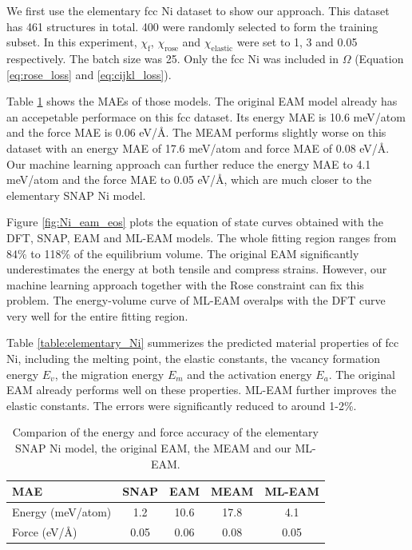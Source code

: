 \documentclass[prb,reprint]{revtex4-2}
\begin{document}
We first use the elementary fcc Ni dataset to show our approach. This dataset 
has 461 structures in total. 400 were randomly selected to form the training 
subset. In this experiment, $\chi_{\mathrm{f}}$, $\chi_{\mathrm{rose}}$ and 
$\chi_{\mathrm{elastic}}$ were set to 1, 3 and 0.05 respectively. The batch size
was 25. Only the fcc Ni was included in $\Omega$ (Equation \ref{eq:rose_loss} 
and \ref{eq:cijkl_loss}).

Table \ref{table:elementary_Ni_mae} shows the MAEs of those models. The original 
EAM model already has an accepetable performace on this fcc dataset. Its energy 
MAE is 10.6 meV/atom and the force MAE is 0.06 eV/\AA. The MEAM performs 
slightly worse on this dataset with an energy MAE of 17.6 meV/atom and force MAE
of 0.08 eV/\AA. Our machine learning approach can further reduce the energy MAE 
to 4.1 meV/atom and the force MAE to 0.05 eV/\AA, which are much closer to the 
elementary SNAP Ni model.

Figure \ref{fig:Ni_eam_eos} plots the equation of state curves obtained with the 
DFT, SNAP, EAM and ML-EAM models. The whole fitting region ranges from 84\% to 
118\% of the equilibrium volume. The original EAM significantly underestimates 
the energy at both tensile and compress strains. However, our machine learning 
approach together with the Rose constraint can fix this problem. The 
energy-volume curve of ML-EAM overalps with the DFT curve very well for the 
entire fitting region. 

Table \ref{table:elementary_Ni} summerizes the predicted material properties of 
fcc Ni, including the melting point, the elastic constants, the vacancy 
formation energy $E_{v}$, the migration energy $E_{m}$ and the activation energy 
$E_{a}$. The original EAM already performs well on these properties. ML-EAM 
further improves the elastic constants. The errors were significantly reduced 
to around 1-2\%.

% 
%
\begin{table}[h]
\centering
\begin{tabular}{lcccc}
\hline
 MAE & SNAP & EAM & MEAM & ML-EAM \\
\hline
Energy (meV/atom) & 1.2 & 10.6 & 17.8 & 4.1 \\
Force (eV/\AA) & 0.05 & 0.06 & 0.08 & 0.05 \\
\hline
\end{tabular}
\caption{\label{table:elementary_Ni_mae} Comparion of the energy and force 
accuracy of the elementary SNAP Ni model, the original EAM, the MEAM and our 
ML-EAM.
}
\end{table}    
\end{document}
